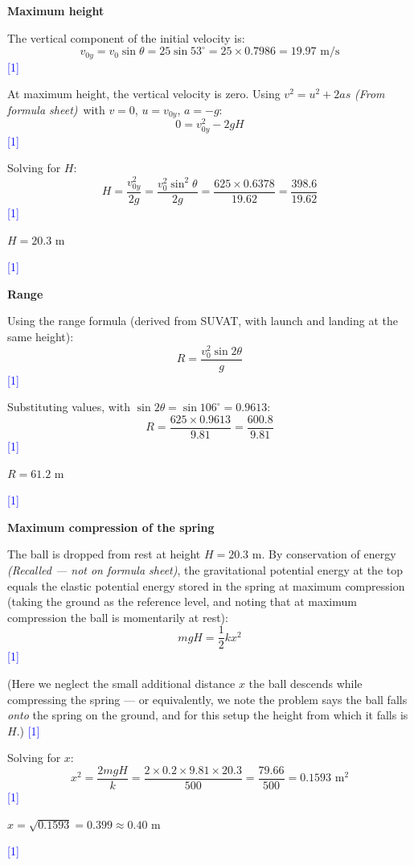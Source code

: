 \documentclass[12pt,a4paper]{article}
\newcommand{\markstep}[1]{\hfill\textcolor{blue}{[#1]}}
\newcommand{\finalanswer}[1]{%
  \begin{tcolorbox}[colback=green!5!white,colframe=green!50!black,boxrule=0.5pt]
  #1
  \end{tcolorbox}
}
\newcommand{\fromsheet}{\textit{(From formula sheet)}}
\newcommand{\recalled}{\textit{(Recalled --- not on formula sheet)}}
\begin{document}
\begin{parts}

\item \textbf{Maximum height} 

The vertical component of the initial velocity is:
\[
v_{0y} = v_0\sin\theta = 25\sin 53^\circ = 25\times 0.7986 = 19.97\text{ m/s}
\]
\markstep{1}

At maximum height, the vertical velocity is zero. Using $v^2 = u^2 + 2as$ \fromsheet\ with $v = 0$, $u = v_{0y}$, $a = -g$:
\[
0 = v_{0y}^2 - 2gH
\]
\markstep{1}

Solving for $H$:
\[
H = \frac{v_{0y}^2}{2g} = \frac{v_0^2\sin^2\theta}{2g} = \frac{625 \times 0.6378}{19.62} = \frac{398.6}{19.62}
\]
\markstep{1}

\finalanswer{$H = 20.3$ m}
\markstep{1}

\item \textbf{Range} 

Using the range formula (derived from SUVAT, with launch and landing at the same height):
\[
R = \frac{v_0^2\sin 2\theta}{g}
\]
\markstep{1}

Substituting values, with $\sin 2\theta = \sin 106^\circ = 0.9613$:
\[
R = \frac{625\times 0.9613}{9.81} = \frac{600.8}{9.81}
\]
\markstep{1}

\finalanswer{$R = 61.2$ m}
\markstep{1}

\item \textbf{Maximum compression of the spring} 

The ball is dropped from rest at height $H = 20.3$ m. By conservation of energy \recalled, the gravitational potential energy at the top equals the elastic potential energy stored in the spring at maximum compression (taking the ground as the reference level, and noting that at maximum compression the ball is momentarily at rest):
\[
mgH = \frac{1}{2}kx^2
\]
\markstep{1}

(Here we neglect the small additional distance $x$ the ball descends while compressing the spring --- or equivalently, we note the problem says the ball falls \emph{onto} the spring on the ground, and for this setup the height from which it falls is $H$.)
\markstep{1}

Solving for $x$:
\[
x^2 = \frac{2mgH}{k} = \frac{2\times 0.2\times 9.81\times 20.3}{500} = \frac{79.66}{500} = 0.1593\text{ m}^2
\]
\markstep{1}

\finalanswer{$x = \sqrt{0.1593} = 0.399 \approx 0.40$ m}
\markstep{1}


\end{parts}
\end{document}
